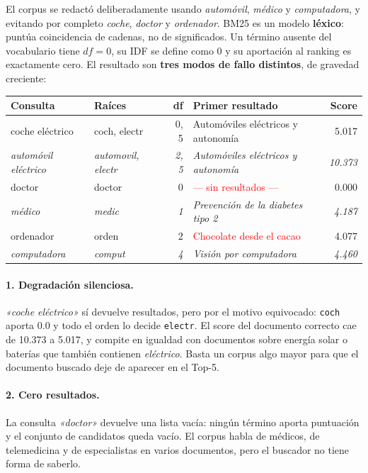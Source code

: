 \documentclass[10pt,a4paper]{article}
\newcommand{\term}[1]{\textcolor{acento}{\texttt{#1}}}
\begin{document}
El corpus se redactó deliberadamente usando \emph{automóvil}, \emph{médico} y \emph{computadora}, y
evitando por completo \emph{coche}, \emph{doctor} y \emph{ordenador}. BM25 es un modelo
\textbf{léxico}: puntúa coincidencia de cadenas, no de significados. Un término ausente del
vocabulario tiene $\mathit{df}=0$, su IDF se define como 0 y su aportación al ranking es
exactamente cero. El resultado son \textbf{tres modos de fallo distintos}, de gravedad creciente:

\begin{table}[h]
\centering\small
\begin{tabular}{@{}p{3.1cm}p{2.0cm}rp{5.1cm}r@{}}
\toprule
\textbf{Consulta} & \textbf{Raíces} & \textbf{df} & \textbf{Primer resultado} & \textbf{Score} \\
\midrule
coche eléctrico     & coch, electr & 0, 5 & Automóviles eléctricos y autonomía & 5.017 \\
\emph{automóvil eléctrico} & \emph{automovil, electr} & \emph{2, 5} & \emph{Automóviles eléctricos y autonomía} & \emph{10.373} \\
\midrule
doctor              & doctor & 0 & \textcolor{red}{--- sin resultados ---} & 0.000 \\
\emph{médico}       & \emph{medic} & \emph{1} & \emph{Prevención de la diabetes tipo 2} & \emph{4.187} \\
\midrule
ordenador           & orden & 2 & \textcolor{red}{Chocolate desde el cacao} & 4.077 \\
\emph{computadora}  & \emph{comput} & \emph{4} & \emph{Visión por computadora} & \emph{4.460} \\
\bottomrule
\end{tabular}
\end{table}

\paragraph{1. Degradación silenciosa.} \emph{«coche eléctrico»} sí devuelve resultados, pero por el
motivo equivocado: \term{coch} aporta 0.0 y todo el orden lo decide \term{electr}. El score del
documento correcto cae de 10.373 a 5.017, y compite en igualdad con documentos sobre energía solar
o baterías que también contienen \emph{eléctrico}. Basta un corpus algo mayor para que el documento
buscado deje de aparecer en el Top-5.

\paragraph{2. Cero resultados.} La consulta \emph{«doctor»} devuelve una lista vacía: ningún término
aporta puntuación y el conjunto de candidatos queda vacío. El corpus habla de médicos, de
telemedicina y de especialistas en varios documentos, pero el buscador no tiene forma de saberlo.
\end{document}

